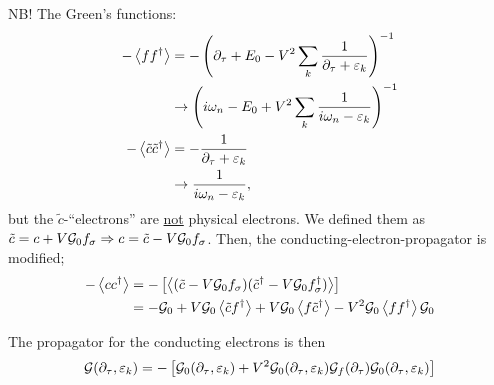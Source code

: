 NB! The Green's functions:
\begin{align*}
	-\ev{ff^\dagger} &= -\left(\partial_\tau + E_0 - V^2 \sum_k\frac{1}{\partial_\tau + \varepsilon_k}\right)^{-1}\\
	&\rightarrow \left(i\omega_n-E_0 + V^2\sum_k \frac{1}{i\omega_n - \varepsilon_k}\right)^{-1} \\
	-\ev{\tilde{c}\tilde{c}^\dagger} &= -\frac{1}{\partial_\tau + \varepsilon_k} \\
	&\rightarrow \frac{1}{i\omega_n-\varepsilon_k},
\end{align*}
but the $\tilde{c}$-``electrons'' are \underline{not} physical electrons. We defined them as $\tilde{c} = c+V\mathcal{G}_0 f_\sigma \Rightarrow c = \tilde{c} - V\mathcal{G}_0 f_\sigma$.
Then, the conducting-electron-propagator is modified;
\begin{align*}
	-\ev{cc^\dagger} &= -\left[\ev{(\tilde{c}-V\Gre f_\sigma)(\tilde{c}^\dagger - V\Gre f_\sigma^\dagger)}\right]\\
	&= -\Gre + V\Gre\ev{\tilde{c}f^\dagger} + V\Gre\ev{f\tilde{c}^\dagger} - V^2\Gre\ev{ff^\dagger}\Gre
\end{align*}

The propagator for the conducting electrons is then
\begin{equation}
	\mathcal{G}(\partial_\tau, \varepsilon_k) = -\left[\mathcal{G}_0(\partial_\tau, \varepsilon_k) + V^2\mathcal{G}_0(\partial_\tau, \varepsilon_k)\mathcal{G}_f(\partial_\tau)\mathcal{G}_0(\partial_\tau, \varepsilon_k)\right]
\end{equation}
